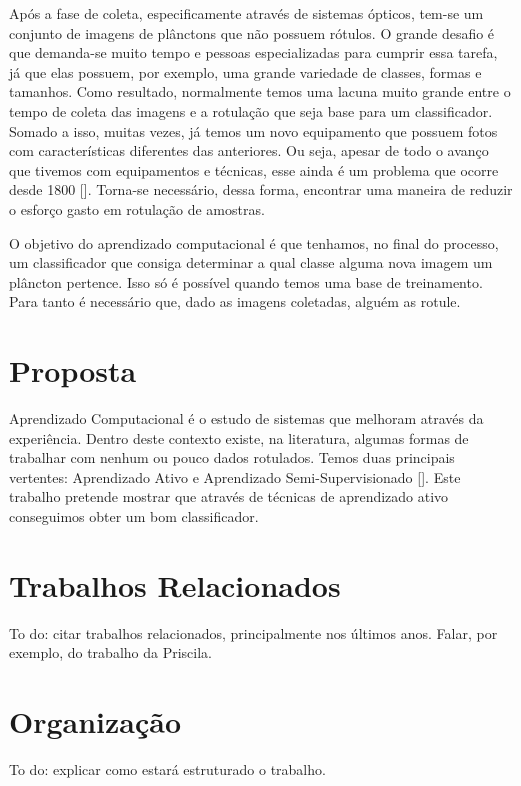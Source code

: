 Após a fase de coleta, especificamente através de sistemas ópticos, tem-se um conjunto de imagens de plânctons que não possuem rótulos. O grande desafio é que demanda-se muito tempo e pessoas especializadas para cumprir essa tarefa, já que elas possuem, por exemplo, uma grande variedade de classes, formas e tamanhos. Como resultado, normalmente temos uma lacuna muito grande entre o tempo de coleta das imagens e a rotulação que seja base para um classificador. Somado a isso, muitas vezes, já temos um novo equipamento que possuem fotos com características diferentes das anteriores. Ou seja, apesar de todo o avanço que tivemos com equipamentos e técnicas, esse ainda é um problema que ocorre desde 1800 [\cite{benfield2007rapid}]. Torna-se necessário, dessa forma, encontrar uma maneira de reduzir o esforço gasto em rotulação de amostras.  
    
O objetivo do aprendizado computacional é que tenhamos, no final do processo, um classificador que consiga determinar a qual classe alguma nova imagem um plâncton pertence. Isso só é possível quando temos uma base de treinamento. Para tanto é necessário que, dado as imagens coletadas, alguém as rotule. 


\section{Proposta}
\label{sec:intro_proposta}

Aprendizado Computacional é o estudo de sistemas que melhoram através da experiência. Dentro deste contexto existe, na literatura, algumas formas de trabalhar com nenhum ou pouco dados rotulados. Temos duas principais vertentes: Aprendizado Ativo e Aprendizado Semi-Supervisionado [\cite{zhu2006semi, abu2012learning}].  Este trabalho pretende mostrar que através de técnicas de aprendizado ativo conseguimos obter um bom classificador.


\section{Trabalhos Relacionados}
\label{sec:intro_relacionados}

To do: citar trabalhos relacionados, principalmente nos últimos anos. Falar, por exemplo, do trabalho da Priscila. 


\section{Organização}
\label{sec:intro_organizacao}

To do: explicar como estará estruturado o trabalho.